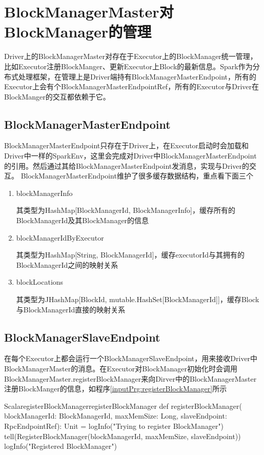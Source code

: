 \section{BlockManagerMaster对BlockManager的管理}
Driver上的BlockManagerMaster对存在于Executor上的BlockManager统一管理，比如Executor注册BlockManger、更新Executor上Block的最新信息。Spark作为分布式处理框架，在管理上是Driver端持有BlockManagerMasterEndpoint，所有的Executor上会有个BlockManagerMasterEndpointRef，所有的Executor与Driver在BlockManger的交互都依赖于它。
\subsection{BlockManagerMasterEndpoint}
BlockManagerMasterEndpoint只存在于Driver上，在Executor启动时会加载和Driver中一样的SparkEnv，这里会完成对Driver中BlockManagerMasterEndpoint的引用。然后通过其给BlockManagerMasterEndpoint发消息，实现与Driver的交互。
BlockManagerMasterEndpoint维护了很多缓存数据结构，重点看下面三个
\begin{enumerate}[\bfseries 1]
	\item blockManagerInfo
	
	其类型为HashMap[BlockManagerId, BlockManagerInfo]，缓存所有的BlockManagerId及其BlockManager的信息
	\item blockManagerIdByExecutor
	
	其类型为HashMap[String, BlockManagerId]，缓存executorId与其拥有的BlockManagerId之间的映射关系
	\item blockLocations
	
	其类型为JHashMap[BlockId, mutable.HashSet[BlockManagerId]]，缓存Block与BlockManagerId直接的映射关系
\end{enumerate}
\subsection{BlockManagerSlaveEndpoint}
在每个Executor上都会运行一个BlockManagerSlaveEndpoint，用来接收Driver中BlockManagerMaster的消息。在Executor对BlockManager初始化时会调用BlockManagerMaster.registerBlockManager来向Dirver中的BlockManagerMaster注册BlockManger的信息，如程序\ref{inputPrg:registerBlockManager}所示
\begin{codeInput}{Scala}{registerBlockManager}{registerBlockManager}
def registerBlockManager(
blockManagerId: BlockManagerId, maxMemSize: Long, slaveEndpoint: RpcEndpointRef): Unit = {
  logInfo("Trying to register BlockManager")
  tell(RegisterBlockManager(blockManagerId, maxMemSize, slaveEndpoint))
  logInfo("Registered BlockManager")
}
\end{codeInput}


